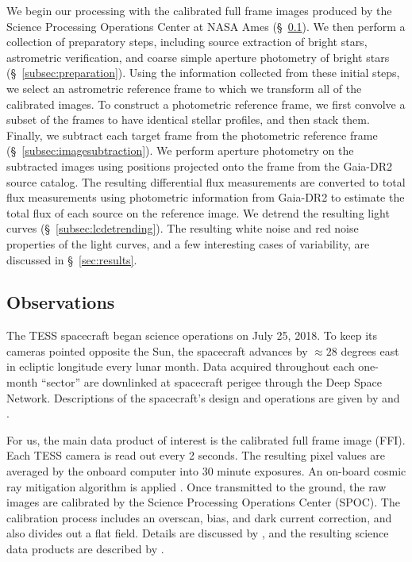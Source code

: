 \documentclass[12pt,twocolumn,tighten]{aastex62}
\begin{document}
We begin our processing with the calibrated full frame images produced
by the Science Processing Operations Center at NASA Ames
(\S~\ref{subsec:observations}).  We then perform a collection of
preparatory steps, including source extraction of bright stars,
astrometric verification, and coarse simple aperture photometry of
bright stars (\S~\ref{subsec:preparation}).  Using the information
collected from these initial steps, we select an astrometric reference
frame to which we transform all of the calibrated images.  To
construct a photometric reference frame, we first convolve a subset of
the frames to have identical stellar profiles, and then stack them.
Finally, we subtract each target frame from the photometric reference
frame (\S~\ref{subsec:imagesubtraction}).  We perform aperture
photometry on the subtracted images using positions projected onto the
frame from the Gaia-DR2 source catalog.  The resulting differential
flux measurements are converted to total flux measurements using
photometric information from Gaia-DR2 to estimate the total flux of
each source on the reference image.  We detrend the resulting light
curves (\S~\ref{subsec:lcdetrending}).  The resulting white noise and
red noise properties of the light curves, and a few interesting cases
of variability, are discussed in \S~\ref{sec:results}.


\subsection{Observations}
\label{subsec:observations}

The TESS spacecraft began science operations on July 25, 2018.  To
keep its cameras pointed opposite the Sun, the spacecraft advances by
$\approx$$28$ degrees east in ecliptic longitude every lunar month.
Data acquired throughout each one-month ``sector'' are downlinked at
spacecraft perigee through the Deep Space Network.  Descriptions of
the spacecraft's design and operations are given by
\citet{ricker_transiting_2015} and \citet{vanderspek_2018}.

For us, the main data product of interest is the calibrated full frame
image (FFI).  Each TESS camera is read out every 2 seconds.  The
resulting pixel values are averaged by the onboard computer into 30
minute exposures. An on-board cosmic ray mitigation algorithm is
applied \citep[][\S 5.1]{vanderspek_2018}. Once transmitted to the
ground, the raw images are calibrated by the Science Processing
Operations Center (SPOC).  The calibration process includes an
overscan, bias, and dark current correction, and also divides out a
flat field.  Details are discussed by \citet{clarke_kepler_2017}, and
the resulting science data products are described by
\citet{tess_data_product_description_2018}.
\end{document}
